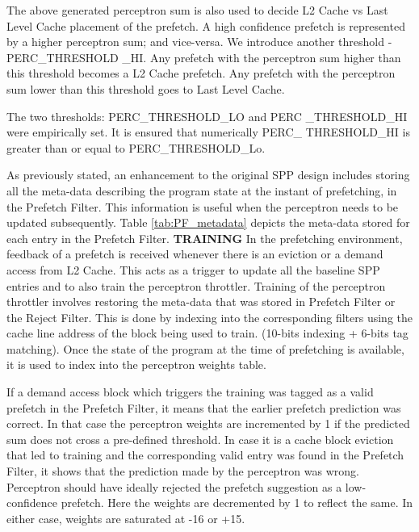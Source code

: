 \documentclass{sig-alternate}
\begin{document}
The above generated perceptron sum is also used to decide L2 Cache vs Last Level Cache placement of the prefetch. 
A high confidence prefetch is represented by a higher perceptron sum; and vice-versa. 
We introduce another threshold - PERC\_THRESHOLD \_HI. 
Any prefetch with the perceptron sum higher than this threshold becomes a L2 Cache prefetch. 
Any prefetch with the perceptron sum lower than this threshold goes to Last Level Cache.

The two thresholds: PERC\_THRESHOLD\_LO and PERC \_THRESHOLD\_HI were empirically set. 
It is ensured that numerically PERC\_ THRESHOLD\_HI is greater than or equal to PERC\_THRESHOLD\_Lo.

As previously stated, an enhancement to the original SPP design includes storing all the meta-data describing the program state at the instant of prefetching, in the Prefetch Filter. 
This information is useful when the perceptron needs to be updated subsequently. 
Table \ref{tab:PF_metadata} depicts the meta-data stored for each entry in the Prefetch Filter.\newline
\newline
\textbf{TRAINING}\newline
In the prefetching environment, feedback of a prefetch is received whenever there is an eviction or a demand access from L2 Cache. 
This acts as a trigger to update all the baseline SPP entries and to also train the perceptron throttler. 
Training of the perceptron throttler involves restoring the meta-data that was stored in Prefetch Filter or the Reject Filter. 
This is done by indexing into the corresponding filters using the cache line address of the block being used to train. (10-bits indexing + 6-bits tag matching). 
Once the state of the program at the time of prefetching is available, it is used to index into the perceptron weights table. 



If a demand access block which triggers the training  was tagged as a valid prefetch in the Prefetch Filter, it means that the earlier prefetch prediction was correct. 
In that case the perceptron weights are incremented by 1 if the predicted sum does not cross a pre-defined threshold. 
 In case it is a cache block eviction that led to training and the corresponding valid entry was found in the Prefetch Filter, it shows that the prediction made by the perceptron was wrong. 
Perceptron should have ideally rejected the prefetch suggestion as a low-confidence prefetch. 
Here the weights are decremented by 1 to reflect the same. 
In either case, weights are saturated at -16 or +15.
\end{document}

